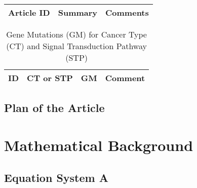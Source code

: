 \begin{table}[H]\centering
	\begin{tabular}{p{1cm}p{4cm}p{3cm}}
		Article ID & Summary & Comments\\
		\hline
		\hline
	\end{tabular}
\end{table}


\begin{table}[H]
\tiny
\caption{Gene Mutations (GM) for Cancer Type (CT) and Signal Transduction Pathway (STP)}
\begin{tabular}{rp{2cm}p{4cm}p{0.5cm}}
\hline 
ID & CT or STP & GM & Comment \\ 
\hline 	
\hline
\end{tabular}
\end{table}

\subsection{Plan of the Article}

\begin{enumerate}
\end{enumerate}


\section{Mathematical Background}

\subsection{Equation System A}

